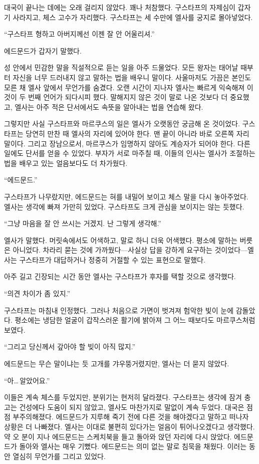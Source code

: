 대국이 끝나는 데에는 오래 걸리지 않았다. 꽤나 처참했다. 구스타프의 자제심이 갑자기 사라지고, 체스 고수가 자리했다. 구스타프는 세 수만에 엘사를 궁지로 몰아넣었다.

``구스타프 형하고 아버지께선 이젠 잘 안 어울리셔.''

에드문드가 갑자기 말했다.

성 안에서 민감한 말을 직설적으로 듣는 일을 아주 드물었다. 모든 왕자는 태어날 때부터 자신을 너무 드러내지 않고 말하는 법을 배우니 말이다. 사울마저도 가끔은 본인도 모른 채 엘사 앞에서 무언가를 숨겼다. 오랜 시간이 지나자 엘사는 빠르게 익숙해져 이것이 두 번째 언어가 되다시피 했다. 말해지지 않은 것이 말로 나온 것보다 더 중요했고, 엘사는 아주 적은 단서에서도 속뜻을 알아내는 법을 연습해 왔다.

그렇지만 사실 구스타프와 마르쿠스의 일은 엘사가 오랫동안 궁금해 온 것이었다. 구스타프는 당연히 만찬 때 엘사의 자리에 있어야 한다. 맨 끝이 아니라 바로 오른쪽 자리 말이다. 그리고 장남으로서, 마르쿠스가 임명하지 않아도 계승자가 되어야 한다. 다른 일에도 단서를 얻을 수 있었다. 부자가 서로 마주칠 때, 이들의 인사는 엘사가 조절하는 법을 배우고 있는 얼음보다도 더 차가웠다.

``에드문드.''

구스타프가 나무랐지만, 에드문드는 혀를 내밀어 보이고 체스 말을 다시 놓아주었다. 엘사는 생각에 빠져 가만히 있었다. 구스타프도 크게 관심을 보이지는 않는 듯했다.

``그냥 마음을 잘 안 쓰시는 거겠지. 난 그렇게 생각해.''

엘사가 말했다. 머릿속에서도 어색하고, 말로 하니 더욱 어색했다. 평소에 말하는 버릇은 아니었다. 차라리 묻는 것에 가까웠다—사실상 답을 강하게 요구하는 것이었다—엘사는 구스타프가 대답하거나 정중히 거절할 수 있는 표현으로 말했다.

아주 길고 긴장되는 시간 동안 엘사는 구스타프가 후자를 택할 것으로 생각했다.

``의견 차이가 좀 있지.''

구스타프는 마침내 인정했다. 그러나 처음으로 가면이 벗겨져 험악한 빛이 눈에 감돌았다. 평소에는 냉담한 얼굴이 갑작스러운 활기에 밝아져 그 어느 때보다도 마르쿠스처럼 보였다.

``그리고 당신께서 갚아야 할 빚이 아직 많지.''

에드문드는 무슨 말이냐는 듯 고개를 갸우뚱거렸지만, 엘사는 더 묻지 않았다.

``아\ldots\,알았어요.''

이들은 계속 체스를 두었지만, 분위기는 현저히 달라졌다. 구스타프는 생각에 잠겨 충고는 건성에다 도움이 되지 않았고, 엘사도 마찬가지로 말없이 계속 두었다. 대국은 점점 부주의해졌다. 에드문드가 지루해 죽기 전에 다른 것을 해야겠다고 말하고 떠나자 상황은 더 나빠졌다. 엘사는 이대로 불편히 있다가는 얼음이 튀어나오겠다고 생각했다. 약 오 분이 지나 에드문드는 스케치북을 들고 돌아와 앉던 자리에 다시 앉았다. 에드문드가 돌아와 엘사는 매우 기뻤다. 에드문드는 의미 없는 말로 침묵을 채웠다. 이러는 동안 열심히 무언가를 그리고 있었다.


